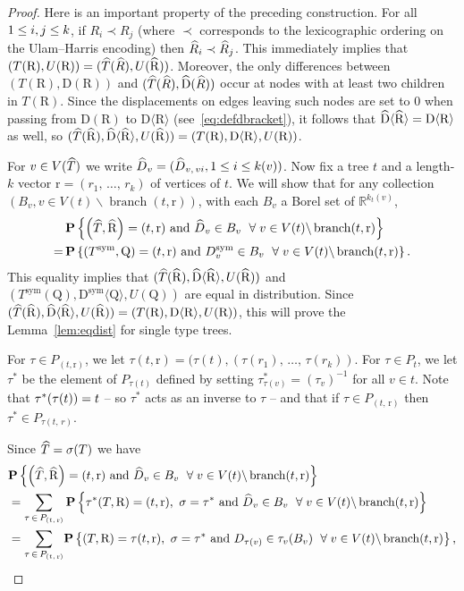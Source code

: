 \documentclass[10pt]{amsart}
\theoremstyle{definition}\newtheorem{defi}[theo]{Definition}\newtheorem{rema}[theo]{Remark}\newtheorem{exam}[theo]{Example}\newtheorem{exem}[theo]{Example}\newtheorem{nota}[theo]{Notation}
\providecommand{\R}{}
\renewcommand{\R}{\mathbb{R}}
\newcommand{\rD}{\mathrm{D}}
\newcommand{\rQ}{\mathrm{Q}}
\newcommand{\rR}{\mathrm{R}}
\newcommand{\rr}{\mathrm{r}}
\DeclareMathOperator{\sym}{sym}
\DeclareMathOperator{\branch}{branch }
\newcommand{\p}[1]{\mathbf{P}\left\{#1\right\}}
\newcommand{\Permvecs}{P}
\newcommand{\angles}[1]{\langle #1 \rangle}
\let\oldhat\hat
\renewcommand*{\hat}[1]{\mathchoice{\widehat{#1}}{\widehat{#1}}{\oldhat{#1}}{\oldhat{#1}}}
\let\oldforall\forall
\renewcommand*{\forall}{\mathrel{\oldforall}}
\begin{document}
\begin{proof}
Here is an important property of the preceding construction. For all $1\le i,j\linebreak \le k$, if $R_i \prec R_j$ (where $\prec$ corresponds to the lexicographic ordering on the Ulam--Harris encoding) then $\hat R_i \prec \hat R_j$. This immediately implies that $(T(\rR),U(\rR))= (\hat T (\hat R),U(\hat \rR))$. Moreover, the only differences between $(T(\rR),\rD(\rR))$ and $(\hat T(\hat R),\hat{\rD}(\hat R))$ occur at nodes with at least two children in $T(\rR)$. Since the displacements on edges leaving such nodes are set to 0 when passing from $\rD(\rR)$ to $\rD\angles{\rR}$ (see~\eqref{eq:defdbracket}), it follows that $\hat \rD\angles{\hat \rR} = \rD\angles{\rR}$ as well, so $(\hat T(\hat \rR),\hat\rD\angles{\hat\rR},U(\hat \rR)) = (T(\rR),\rD\angles{\rR},U(\rR))$.

For $v \in V(\hat{T})$ we write $\hat{D}_v = (\hat{D}_{v,\,vi},1 \le i \le k(v))$. Now fix a tree $t$ and a length-$k$ vector $\rr=(r_1,\,\ldots,\,r_k)$ of vertices of $t$. We will show that for any collection $(B_v, v\in V(t)\backslash \branch(t,\rr))$, with each $B_v$ a Borel set of $\R^{k_t(v)}$,
\begin{align*}
&\p{\left(\hat T,\hat \rR\right)=(t,\rr) \text{ and } \hat D_v \in B_v\ \forall v \in V(t)\backslash \branch(t,\rr)}\\ 
=\,&\p{\left(T^{\sym},\rQ\right)=(t,\rr) \text{ and }D^{\sym}_v \in B_v\ \forall v \in V(t)\backslash \branch(t,\rr)}.
\end{align*}
This equality implies that $(\hat T(\hat \rR),\hat\rD\angles{\hat\rR},U(\hat \rR))$ and $(T^{\sym}(\rQ),\rD^{\sym}\angles{\rQ},U(\rQ))$ are equal in distribution. Since $(\hat T(\hat \rR),\hat\rD\angles{\hat\rR},U(\hat \rR)) = (T(\rR),\rD\angles{\rR},U(\rR))$, this will prove the Lemma~\ref{lem:eqdist} for single type trees.

For $\tau \in \Permvecs_{(t,\rr)}$, we let $\tau(t,\rr)=(\tau(t),(\tau(r_1),\,\ldots,\,\tau(r_k))$. For $\tau \in \Permvecs_t$, we let $\tau^{*}$ be the element of $\Permvecs_{\tau(t)}$ defined by setting $\tau^*_{\tau(v)} = (\tau_v)^{-1}$ for all $v \in t$. Note that $\tau^*(\tau(t))\linebreak=t$ -- so $\tau^*$ acts as an inverse to $\tau$ -- and that if $\tau \in \Permvecs_{(t,\,\rr)}$ then $\tau^*\in \Permvecs_{\tau(t,\,r)}$.

Since $\hat T=\sigma(T)$ we have
\begin{align*}
& \p{\left(\hat T,\hat \rR\right)=(t,\rr)\text{ and } \hat D_v \in B_v\ \forall v \in V(t)\backslash \branch(t,\rr)}\\
&=\sum_{\tau\,\in\,\Permvecs_{(t,\,\rr)}}
\p{\tau^*(T,\rR)=(t,\rr),\ \sigma=\tau^*\text{ and } \hat D_v \in B_v\ \forall v \in V(t)\backslash \branch(t,\rr)}\\
&=\sum_{\tau\,\in\,\Permvecs_{(t,\,\rr)}}
\!\p{(T,\rR)=\tau(t,\rr),\ \sigma=\tau^* \text{ and } D_{\tau(v)} \in \tau_v(B_v)\ \forall v \in V(t)\backslash \branch(t,\rr)},
\end{align*}


\end{proof}
\end{document}
